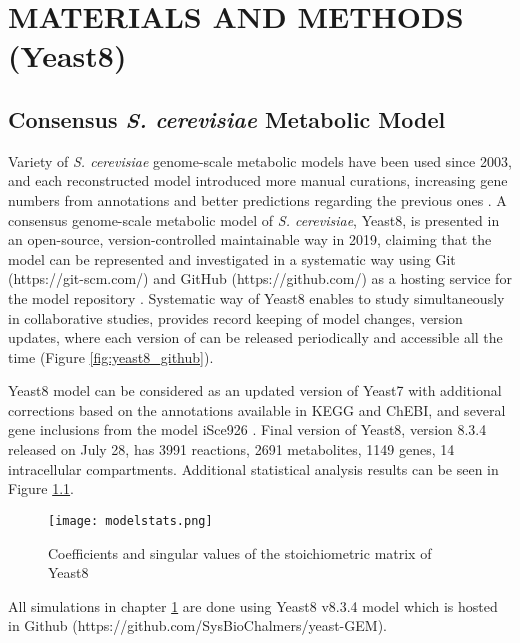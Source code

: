 \chapter{MATERIALS AND METHODS (Yeast8)} \label{chapter:yeast8}

\section{Consensus \emph{S. cerevisiae} Metabolic Model}
Variety of \emph{S. cerevisiae} genome-scale metabolic models have been used since 2003, and each reconstructed model introduced more manual curations, increasing gene numbers from annotations and better predictions regarding the previous ones \cite{lopes2017genome}. A consensus genome-scale metabolic model of \emph{S. cerevisiae}, Yeast8, is presented in an open-source, version-controlled maintainable way in 2019, claiming that the model can be represented and investigated in a systematic way using Git (https://git-scm.com/) and GitHub (https://github.com/) as a hosting service for the model repository \cite{lu2019consensus}. Systematic way of Yeast8 enables to study simultaneously in collaborative studies, provides record keeping of model changes, version updates, where each version of can be released periodically and accessible all the time (Figure \ref{fig:yeast8_github}).

Yeast8 model can be considered as an updated version of Yeast7 \cite{aung2013revising} with additional corrections based on the annotations available in KEGG and ChEBI, and several gene inclusions from the model iSce926 \cite{chowdhury2015using}. Final version of Yeast8, version 8.3.4 released on July 28, has 3991 reactions, 2691 metabolites, 1149 genes, 14 intracellular compartments. Additional statistical analysis results can be seen in Figure \ref{fig:modelstats}.

\begin{figure}[H]
\begin{center}
\texttt{[image: modelstats.png]}
\end{center}
\caption[Coefficients and singular values of the stoichiometric matrix of Yeast8]{Coefficients and singular values of the stoichiometric matrix of Yeast8}
\label{fig:modelstats}
\end{figure}

All simulations in chapter \cref{chapter:yeast8} are done using Yeast8 v8.3.4 model which is hosted in Github (https://github.com/SysBioChalmers/yeast-GEM).

